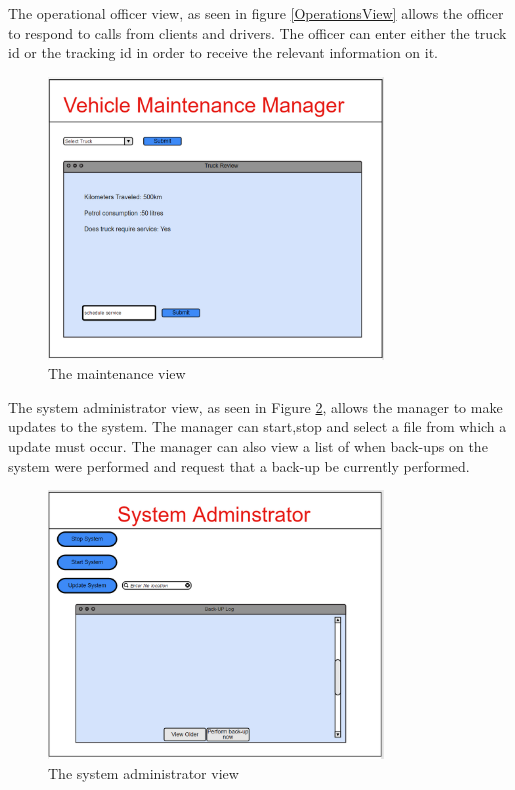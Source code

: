 \documentclass[paper=a4, fontsize=11pt]{scrartcl} %
\numberwithin{equation}{section} %
\numberwithin{figure}{section} %
\numberwithin{table}{section} %
\begin{document}
The operational officer view, as seen in figure \ref{OperationsView} allows the officer to respond to calls from clients and drivers. The officer can enter either the truck id or the tracking id in order to receive the relevant information on it. 
\\

\begin{figure}[hbt!]
\centering
\includegraphics[width=3.5in]{pictures/maintenance.png}
\caption{The maintenance view }
\label{MaintenanceView}
\end{figure}

The system administrator view, as seen in Figure \ref{AdminView}, allows the manager to make updates to the system. The manager can start,stop and select a file from which a update must occur. The manager can also view a list of when back-ups on the system were performed and request that a back-up be currently performed.
\\

\begin{figure}[hbt!]
\centering
\includegraphics[width=3.5in]{pictures/admin.png}
\caption{The system administrator view}
\label{AdminView}
\end{figure}
\end{document}
